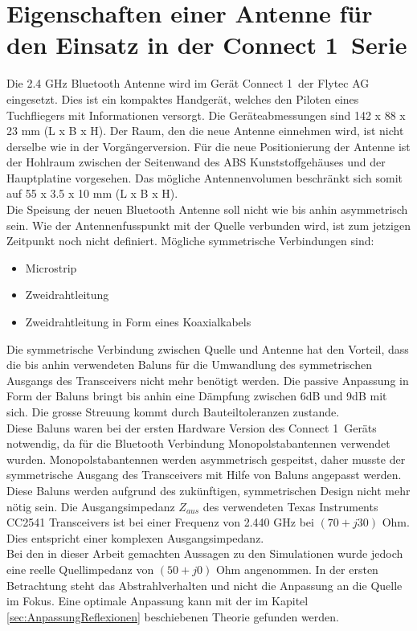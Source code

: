 \section{Eigenschaften einer Antenne für den Einsatz in der \glqq Connect 1\grqq \  Serie}\label{sec:EigenschaftenAntenne}
Die 2.4 GHz Bluetooth Antenne wird im Gerät \glqq Connect 1\grqq \  der Flytec AG eingesetzt. Dies ist ein kompaktes Handgerät, welches den Piloten eines Tuchfliegers mit Informationen versorgt. Die Geräteabmessungen sind 142 x 88 x 23 mm (L x B x H). Der Raum, den die neue Antenne einnehmen wird, ist nicht derselbe wie in der Vorgängerversion. Für die neue Positionierung der Antenne ist der Hohlraum zwischen der Seitenwand des ABS Kunststoffgehäuses und der Hauptplatine  vorgesehen. Das mögliche Antennenvolumen beschränkt sich somit auf 55 x 3.5 x 10 mm (L x B x H).\\
Die Speisung der neuen Bluetooth Antenne soll nicht wie bis anhin asymmetrisch sein. Wie der Antennenfusspunkt mit der Quelle verbunden wird, ist zum jetzigen Zeitpunkt noch nicht definiert. Mögliche symmetrische Verbindungen sind:
\begin{itemize}
\item Microstrip   
\item Zweidrahtleitung
\item Zweidrahtleitung in Form eines Koaxialkabels
\end{itemize}
Die symmetrische Verbindung zwischen Quelle und Antenne hat den Vorteil, dass die bis anhin verwendeten Baluns für die Umwandlung des symmetrischen Ausgangs des Transceivers nicht mehr benötigt werden. Die passive Anpassung in Form der Baluns bringt bis anhin eine Dämpfung zwischen 6dB und 9dB mit sich. Die grosse Streuung kommt durch Bauteiltoleranzen zustande.\\
Diese Baluns waren bei der ersten Hardware Version des \glqq Connect 1\grqq \ Geräts notwendig, da für die Bluetooth Verbindung Monopolstabantennen verwendet wurden. Monopolstabantennen werden asymmetrisch gespeitst, daher musste der symmetrische Ausgang des Transceivers mit Hilfe von Baluns angepasst werden. Diese Baluns werden aufgrund des zukünftigen, symmetrischen Design nicht mehr nötig sein. Die Ausgangsimpedanz $Z_{aus}$ des verwendeten Texas Instruments CC2541 Transceivers ist bei einer Frequenz von 2.440 GHz bei $(70+j30)$ Ohm. Dies entspricht einer komplexen Ausgangsimpedanz. \\
Bei den in dieser Arbeit gemachten Aussagen zu den Simulationen wurde jedoch eine reelle Quellimpedanz von $(50+j0)$ Ohm angenommen. In der ersten Betrachtung steht das Abstrahlverhalten und nicht die Anpassung an die Quelle im Fokus. Eine optimale Anpassung kann mit der im Kapitel \ref{sec:AnpassungReflexionen} beschiebenen Theorie gefunden werden.\\
